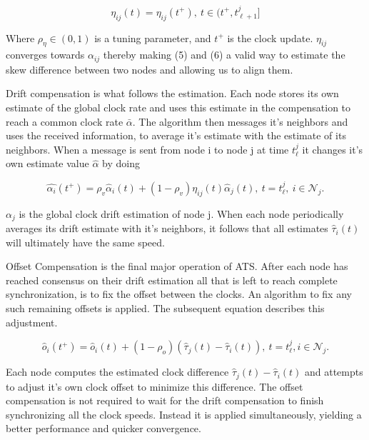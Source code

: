 \documentclass[a4paper,12pt]{article}
\begin{document}
    \begin{equation}
        \eta_{ij}(t) = \eta_{ij}(t^+),\ t \in (t^+, t_{\ell + 1}^j]
    \end{equation}
    
    Where $\rho_\eta \in (0, 1)$ is a tuning parameter, and $t^+$ is the clock update. $\eta_{ij}$ converges towards $\alpha_{ij}$ thereby making (5) and (6) a valid way to estimate the skew difference between two nodes and allowing us to align them.
    
    Drift compensation is what follows the estimation. Each node stores its own estimate of the global clock rate and uses this estimate in the compensation to reach a common clock rate $\bar{\alpha}$. The algorithm then messages it's neighbors and uses the received information, to average it's estimate with the estimate of its neighbors. When a message is sent from node i to node j at time $t^j_\ell$ it changes it's own estimate value $\hat{\alpha}$ by doing
    
    \begin{equation}
        \hat{\alpha_i}(t^+) = \rho_v\hat\alpha_i(t) + (1 - \rho_v)\eta_{ij}(t)\hat\alpha_j(t), \ t = t^j_\ell, \ i \in \mathcal{N}_j.
    \end{equation}
    
    $\alpha_j$ is the global clock drift estimation of node j. When each node periodically averages its drift estimate with it's neighbors, it follows that all estimates $\hat\tau_i(t)$ will ultimately have the same speed.
    
    
    Offset Compensation is the final major operation of ATS. After each node has reached consensus on their drift estimation all that is left to reach complete synchronization, is to fix the offset between the clocks. An algorithm to fix any such remaining offsets is applied. The subsequent equation describes this adjustment.
    
    \begin{equation}
        \hat{o}_i(t^+) = \hat{o}_i(t) + (1 - \rho_o)(\hat{\tau}_j(t) - \hat{\tau}_i(t)), \ t=t^j_\ell,i \in \mathcal{N}_j.
    \end{equation}
    
    Each node computes the estimated clock difference $\hat\tau_j(t) - \hat\tau_i(t)$ and attempts to adjust it's own clock offset to minimize this difference. The offset compensation is not required to wait for the drift compensation to finish synchronizing all the clock speeds. Instead it is applied simultaneously, yielding a better performance and quicker convergence.  
    
\end{document}
